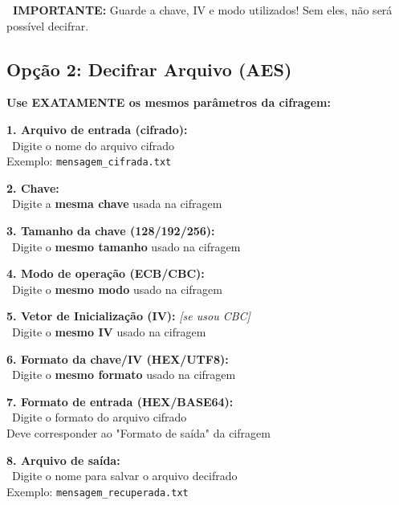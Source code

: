\documentclass[12pt,a4paper]{article}
\begin{document}
\begin{warningbox}
\textbf{\faExclamationTriangle\ IMPORTANTE:} Guarde a chave, IV e modo utilizados! Sem eles, não será possível decifrar.
\end{warningbox}

\subsection{Opção 2: Decifrar Arquivo (AES)}

\textbf{Use EXATAMENTE os mesmos parâmetros da cifragem:}

\begin{tcolorbox}[colback=successgreen!10,colframe=successgreen,title={\faUnlock\ Campos para Decifragem AES}]

\textbf{1. Arquivo de entrada (cifrado):}\\
\quad \faFileAlt\ Digite o nome do arquivo cifrado\\
\quad Exemplo: \texttt{mensagem\_cifrada.txt}

\textbf{2. Chave:}\\
\quad \faKey\ Digite a \textbf{mesma chave} usada na cifragem

\textbf{3. Tamanho da chave (128/192/256):}\\
\quad \faHashtag\ Digite o \textbf{mesmo tamanho} usado na cifragem

\textbf{4. Modo de operação (ECB/CBC):}\\
\quad \faCogs\ Digite o \textbf{mesmo modo} usado na cifragem

\textbf{5. Vetor de Inicialização (IV):} \textit{[se usou CBC]}\\
\quad \faRandom\ Digite o \textbf{mesmo IV} usado na cifragem

\textbf{6. Formato da chave/IV (HEX/UTF8):}\\
\quad \faCode\ Digite o \textbf{mesmo formato} usado na cifragem

\textbf{7. Formato de entrada (HEX/BASE64):}\\
\quad \faFileCode\ Digite o formato do arquivo cifrado\\
\quad Deve corresponder ao "Formato de saída" da cifragem

\textbf{8. Arquivo de saída:}\\
\quad \faSave\ Digite o nome para salvar o arquivo decifrado\\
\quad Exemplo: \texttt{mensagem\_recuperada.txt}

\end{tcolorbox}
\end{document}
